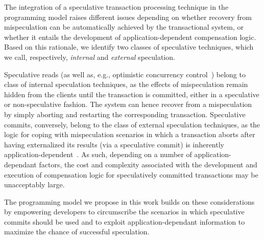 The integration of a speculative transaction processing technique in the programming model raises different issues depending on whether recovery from mispeculation can be automatically achieved by the transactional system, or whether it entails the development of application-dependent compensation logic. Based on this rationale, we identify two classes of speculative techniques, which we call, respectively, \textit{internal} and \textit{external} speculation.

Speculative reads (as well as, e.g., optimistic concurrency control~\cite{xxxx}) belong to class of internal speculation techniques, as the effects of mispeculation remain hidden from the clients until the transaction is committed, either in a speculative or non-speculative fashion. The system can hence recover from a mispeculation by simply aborting and restarting the corresponding transaction. Speculative commits, conversely, belong to the class of external speculation techniques, as the logic for coping with mispeculation scenarios in which a transaction aborts after having externalized its results  (via a speculative commit) is inherently application-dependent~\cite{eventual-consistency}. As such, depending on a number of application-dependant factors, the cost and complexity associated with the development and execution of compensation logic for speculatively committed transactions may be unacceptably large.

The programming model we propose in this work builds on these considerations by empowering  developers to circumscribe the scenarios in which speculative commits should be used and to exploit application-dependant information to maximize the chance of successful speculation.

